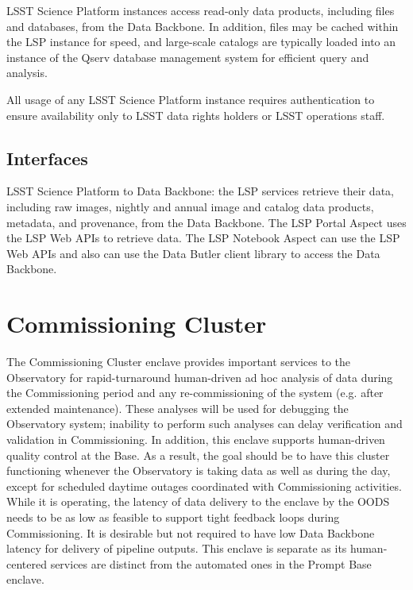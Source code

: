 \documentclass[DM,toc,lsstdraft]{lsstdoc}
\begin{document}
LSST Science Platform instances access read-only data products, including files and databases, from the Data Backbone.
In addition, files may be cached within the LSP instance for speed, and large-scale catalogs are typically loaded into an instance of the Qserv database management system for efficient query and analysis.

All usage of any LSST Science Platform instance requires authentication
to ensure availability only to LSST data rights holders or LSST
operations staff.

\subsection{Interfaces}\label{dac-interfaces}

LSST Science Platform to Data Backbone: the LSP services retrieve their data, including raw images, nightly and
annual image and catalog data products, metadata, and provenance, from the Data
Backbone.  The LSP Portal Aspect uses the LSP Web APIs to retrieve data.  The
LSP Notebook Aspect can use the LSP Web APIs and also can use the Data Butler
client library to access the Data Backbone.


\section{Commissioning Cluster}\label{commissioning-cluster}

The Commissioning Cluster enclave provides important services to the Observatory for rapid-turnaround human-driven ad hoc analysis of data during the Commissioning period and any re-commissioning of the system (e.g. after extended maintenance).
These analyses will be used for debugging the Observatory system; inability to perform such analyses can delay verification and validation in Commissioning.
In addition, this enclave supports human-driven quality control at the Base.
As a result, the goal should be to have this cluster functioning whenever the Observatory is taking data as well as during the day, except for scheduled daytime outages coordinated with Commissioning activities.
While it is operating, the latency of data delivery to the enclave by the OODS needs to be as low as feasible to support tight feedback loops during Commissioning.
It is desirable but not required to have low Data Backbone latency for delivery of pipeline outputs.
This enclave is separate as its human-centered services are distinct from the automated ones in the Prompt Base enclave.
\end{document}
